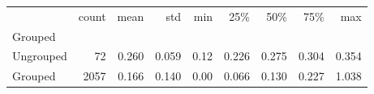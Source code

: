 \begin{tabular}{lrrrrrrrr}
\toprule
{} &  count &   mean &    std &   min &    25\% &    50\% &    75\% &    max \\
Grouped   &        &        &        &       &        &        &        &        \\
\midrule
Ungrouped &     72 &  0.260 &  0.059 &  0.12 &  0.226 &  0.275 &  0.304 &  0.354 \\
Grouped   &   2057 &  0.166 &  0.140 &  0.00 &  0.066 &  0.130 &  0.227 &  1.038 \\
\bottomrule
\end{tabular}
